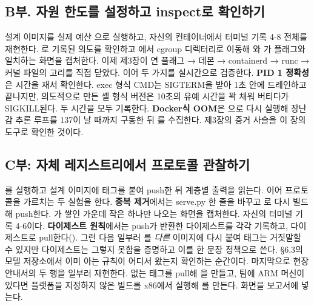 \subsection*{B부. 자원 한도를 설정하고 inspect로 확인하기}

설계 이미지를 실제 예산 으로 실행하고, 자신의 컨테이너에서 터미널 기록 4-8 전체를 재현한다. 로 기록된 의도를 확인하고 에서 cgroup 디렉터리로 이동해 와 가 플래그와 일치하는 화면을 캡처한다. 이제 제3장이 연 플래그 → 데몬 → containerd → runc → 커널 파일의 고리를 직접 닫았다. 이어 두 가지를 실시간으로 검증한다. \textbf{PID 1 정확성}은  시간을 재서 확인한다. exec 형식 CMD는 SIGTERM을 받아 1초 안에 드레인하고 끝나지만, 의도적으로 만든 셸 형식 버전은 10초의 유예 시간을 꽉 채워 버티다가 SIGKILL된다. 두 시간을 모두 기록한다. \textbf{Docker식 OOM}은 으로 다시 실행해 장난감 추론 루프를 137이 날 때까지 구동한 뒤 를 수집한다. 제3장의 증거 사슬을 이 장의 도구로 확인한 것이다.

\subsection*{C부: 자체 레지스트리에서 프로토콜 관찰하기}

를 실행하고 설계 이미지에 태그를 붙여 push한 뒤 계층별 출력을 읽는다. 이어 프로토콜을 가르치는 두 실험을 한다. \textbf{중복 제거}에서는 serve.py 한 줄을 바꾸고 로 다시 빌드해 push한다. 가 쌓인 가운데 작은  하나만 나오는 화면을 캡처한다. 자신의 터미널 기록 4-6이다. \textbf{다이제스트 원칙}에서는 push가 반환한 다이제스트를 각각 기록하고, 다이제스트로 pull한다(). 그런 다음 일부러 를 \textit{다른} 이미지에 다시 붙여 태그는 거짓말할 수 있지만 다이제스트는 그렇지 못함을 증명하고 이를 한 문장 정책으로 쓴다. §6.3의 모델 저장소에서 이미 아는 규칙이 어디서 왔는지 확인하는 순간이다. 마지막으로 현장 안내서의 두 행을 일부러 재현한다. 없는 태그를 pull해 을 만들고, 팀에 ARM 머신이 있다면 플랫폼을 지정하지 않은 빌드를 x86에서 실행해 를 만든다. 화면을 보고서에 넣는다.

